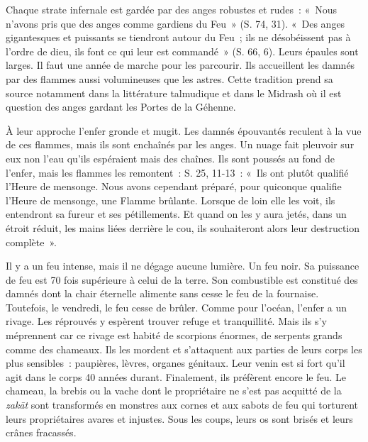 Chaque strate infernale est gardée par des anges robustes et rudes~:
«~Nous n'avons pris que des anges comme gardiens du Feu~» (S. 74, 31).
«~Des anges gigantesques et puissants se tiendront autour du Feu~; ils
ne désobéissent pas à l'ordre de dieu, ils font ce qui leur est
commandé~» (S. 66, 6). Leurs épaules sont larges. Il faut une année de
marche pour les parcourir. Ils accueillent les damnés par des flammes
aussi volumineuses que les astres. Cette tradition prend sa source
notamment dans la littérature talmudique et dans le Midrash où il est
question des anges gardant les Portes de la Géhenne.

À leur approche l'enfer gronde et mugit. Les damnés épouvantés reculent
à la vue de ces flammes, mais ils sont enchaînés par les anges. Un nuage
fait pleuvoir sur eux non l'eau qu'ils espéraient mais des chaînes. Ils
sont poussés au fond de l'enfer, mais les flammes les remontent~: S. 25,
11-13~: «~Ils ont plutôt qualifié l'Heure de mensonge. Nous avons
cependant préparé, pour quiconque qualifie l'Heure de mensonge, une
Flamme brûlante. Lorsque de loin elle les voit, ils entendront sa fureur
et ses pétillements. Et quand on les y aura jetés, dans un étroit
réduit, les mains liées derrière le cou, ils souhaiteront alors leur
destruction complète~».


Il y a un feu intense, mais il ne dégage aucune lumière. Un feu noir. Sa
puissance de feu est 70 fois supérieure à celui de la terre. Son
combustible est constitué des damnés dont la chair éternelle alimente
sans cesse le feu de la fournaise. Toutefois, le vendredi, le feu cesse
de brûler. Comme pour l'océan, l'enfer a un rivage. Les réprouvés y
espèrent trouver refuge et tranquillité. Mais ils s'y méprennent car ce
rivage est habité de scorpions énormes, de serpents grands comme des
chameaux. Ils les mordent et s'attaquent aux parties de leurs corps les
plus sensibles~: paupières, lèvres, organes génitaux. Leur venin est si
fort qu'il agit dans le corps 40 années durant. Finalement, ils
préfèrent encore le feu. Le chameau, la brebis ou la vache dont le
propriétaire ne s'est pas acquitté de la \emph{zakāt} sont transformés
en monstres aux cornes et aux sabots de feu qui torturent leurs
propriétaires avares et injustes. Sous les coups, leurs os sont brisés
et leurs crânes fracassés.

